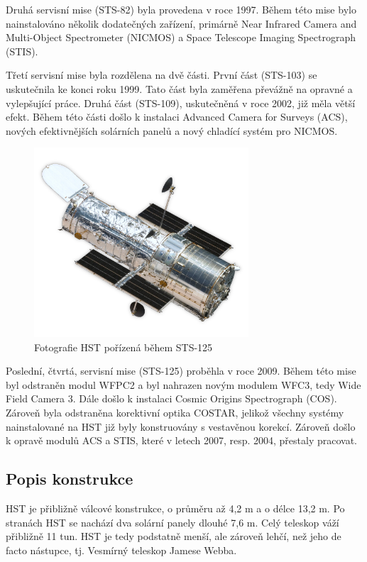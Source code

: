 \documentclass[a4paper,11pt]{article}
\begin{document}
Druhá servisní mise (STS-82) byla provedena v roce 1997. Během této mise bylo nainstalováno několik dodatečných zařízení, primárně Near Infrared Camera and Multi-Object Spectrometer (NICMOS) a Space Telescope Imaging Spectrograph (STIS).

Třetí servisní mise byla rozdělena na dvě části. První část (STS-103) se uskutečnila ke konci roku 1999. Tato část byla zaměřena převážně na opravné a vylepšující práce. Druhá část (STS-109), uskutečněná v roce 2002, již měla větší efekt. Během této části došlo k instalaci Advanced Camera for Surveys (ACS), nových efektivnějších solárních panelů a nový chladící systém pro NICMOS.

\begin{figure}[h]
	\begin{center}
		\includegraphics[width=8cm]{HST-SM4.png}
		\caption{Fotografie HST pořízená během STS-125}
		\label{HST-SM4}
	\end{center}
\end{figure}

Poslední, čtvrtá, servisní mise (STS-125) proběhla v roce 2009. Během této mise byl odstraněn modul WFPC2 a byl nahrazen novým modulem WFC3, tedy Wide Field Camera 3. Dále došlo k instalaci Cosmic Origins Spectrograph (COS). Zároveň byla odstraněna korektivní optika COSTAR, jelikož všechny systémy nainstalované na HST již byly konstruovány s vestavěnou korekcí. Zároveň došlo k opravě modulů ACS a STIS, které v letech 2007, resp. 2004, přestaly pracovat.

\subsection{Popis konstrukce}

HST je přibližně válcové konstrukce, o průměru až 4,2 m a o délce 13,2 m. Po stranách HST se nachází dva solární panely dlouhé 7,6 m. Celý teleskop váží přibližně 11 tun. HST je tedy podstatně menší, ale zároveň lehčí, než jeho de facto nástupce, tj. Vesmírný teleskop Jamese Webba.
\end{document}
